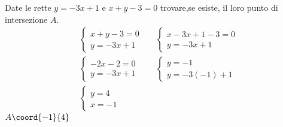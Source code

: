 Date le rette $y=-3x+1$ e $x+y-3=0$ trovare,se esiste, il loro punto di intersezione $A$.
\begin{align*}
&\begin{cases}
x+y-3=0\\
y=-3x+1
\end{cases}
&&\begin{cases}
x-3x+1-3=0\\
y=-3x+1
\end{cases}\\
&\begin{cases}
-2x-2=0\\
y=-3x+1
\end{cases}
&&\begin{cases}
y=-1\\
y=-3(-1)+1
\end{cases}\\
&\begin{cases}
y=4\\
x=-1
\end{cases}
\end{align*}
$A\coord{-1}{4}$
\begin{center}
	
\end{center}
